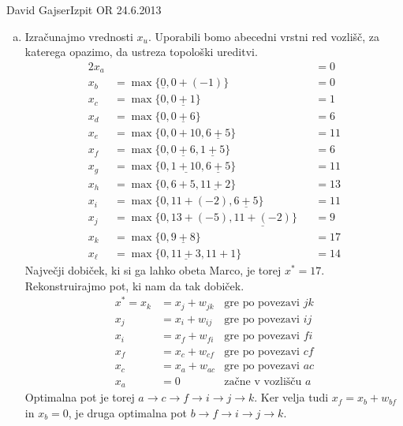 \begin{naloga}{David Gajser}{Izpit OR 24.6.2013}
\begin{odgovor}
\begin{enumerate}[(a)]
\item Izračunajmo vrednosti $x_u$.
Uporabili bomo abecedni vrstni red vozlišč,
za katerega opazimo, da ustreza topološki ureditvi.
\begin{alignat*}{2}
x_a &&&= 0 \\
x_b &= \max\{\underline{0}, 0+(-1)\} &&= 0 \\
x_c &= \max\{0, \underline{0+1}\} &&= 1 \\
x_d &= \max\{0, \underline{0+6}\} &&= 6 \\
x_e &= \max\{0, 0+10, \underline{6+5}\} &&= 11 \\
x_f &= \max\{0, \underline{0+6}, \underline{1+5}\} &&= 6 \\
x_g &= \max\{0, \underline{1+10}, \underline{6+5}\} &&= 11 \\
x_h &= \max\{0, 6+5, \underline{11+2}\} &&= 13 \\
x_i &= \max\{0, 11+(-2), \underline{6+5}\} &&= 11 \\
x_j &= \max\{0, 13+(-5), \underline{11+(-2)}\} &&= 9 \\
x_k &= \max\{0, \underline{9+8}\} &&= 17 \\
x_\ell &= \max\{0, \underline{11+3}, 11+1\} &&= 14
\end{alignat*}
Največji dobiček, ki si ga lahko obeta Marco, je torej $x^* = 17$.
Rekonstruirajmo pot, ki nam da tak dobiček.
\begin{align*}
x^* = x_k &= x_j + w_{jk} & \text{gre po povezavi $jk$} \\
x_j &= x_i + w_{ij} & \text{gre po povezavi $ij$} \\
x_i &= x_f + w_{fi} & \text{gre po povezavi $fi$} \\
x_f &= x_c + w_{cf} & \text{gre po povezavi $cf$} \\
x_c &= x_a + w_{ac} & \text{gre po povezavi $ac$} \\
x_a &= 0 & \text{začne v vozlišču $a$}
\end{align*}
Optimalna pot je torej $a \to c \to f \to i \to j \to k$.
Ker velja tudi $x_f = x_b + w_{bf}$ in $x_b = 0$,
je druga optimalna pot $b \to f \to i \to j \to k$.
\end{enumerate}
\end{odgovor}
\end{naloga}
